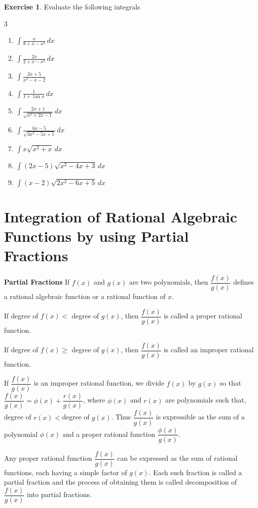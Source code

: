 \documentclass{book}
\theoremstyle{definition}
\newtheorem{exercise}{Exercise}[section]
\begin{document}
\begin{exercise}
Evaluate the following integrals
\begin{multicols}{3}
\begin{enumerate}[label=(\roman*)]
    \item $\displaystyle\int \frac{x}{8+x-x^2}\,dx$
    \item $\displaystyle\int\frac{2x}{2+x-x^2}\,dx$
    \item $\displaystyle\int\frac{2x+5}{x^2-x-2}$
    \item $\displaystyle\int \frac{1}{1+\tan x}\,dx$
    \item $\displaystyle\int \frac{2x+1}{\sqrt{x^2+2x-1}}\,dx$   
    \item $\displaystyle\int\frac{6x-5}{\sqrt{3x^2-5x+1}}\,dx$
    \item $\displaystyle\int x\sqrt{x^2+x}\,dx$
    \item $\displaystyle\int (2x-5)\sqrt{x^2-4x+3}\,dx$
    \item $\displaystyle\int (x-2)\sqrt{2x^2-6x+5}\,dx$

\end{enumerate}
\end{multicols}    
\end{exercise}

\section{Integration of Rational Algebraic Functions by using Partial Fractions}

\textbf{Partial Fractions} If $f(x)$ and $g(x)$ are two polynomials, then $\dfrac{f(x)}{g(x)}$ defines a rational algebraic function or a rational function of $x$.

If degree of $f(x)< $ degree of $g(x)$, then $\dfrac{f(x)}{g(x)}$ is called a proper rational function.

If degree of $f(x)\geq  $ degree of $g(x)$, then $\dfrac{f(x)}{g(x)}$ is called an improper rational function.

If $\dfrac{f(x)}{g(x)}$ is an improper rational function, we divide $f(x)$ by $g(x)$ so that $\dfrac{f(x)}{g(x)}=\phi(x)+\dfrac{r(x)}{g(x)}$, where $\phi(x)$ and $r(x)$ are polynomials such that, degree of $r(x)< $degree of $g(x)$. Thus $\dfrac{f(x)}{g(x)}$ is expressible as the sum of a polynomial $\phi(x)$ and a proper rational function $\dfrac{\phi(x)}{g(x)}$.

Any proper rational function $\dfrac{f(x)}{g(x)}$ can be expressed as the sum of rational functions, each having a simple factor of $g(x)$. Each such fraction  is called a partial fraction and the process of obtaining them is called decomposition of $\dfrac{f(x)}{g(x)}$ into partial fractions.
\end{document}
